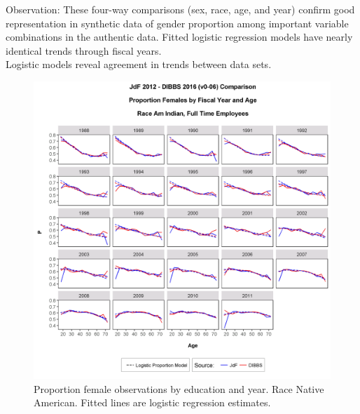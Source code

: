 \documentclass[10pt, letterpaper]{article}
\begin{document}
\begin{spacing}{1.0}
Observation:  These four-way comparisons (sex, race, age, and year) confirm good representation in synthetic data of gender proportion among important variable combinations in the authentic data.  Fitted logistic regression models have nearly identical trends through fiscal years.\\

Logistic models reveal agreement in trends between data sets.

\vspace{20pt}

\begin{figure}[h!]
    \centering
    \includegraphics[width=6.5in, trim={0 0 0 1in}, clip]{GenderProportionLogisticModelFYRaceAgeAv0-06.png}
    \caption{Proportion female observations by education and year.  Race Native American.  Fitted lines are logistic regression estimates.}
    \label{figure:GenderProportionLogisticModelFYRaceAgeA}
\end{figure}

\clearpage


\end{spacing}
\end{document}
